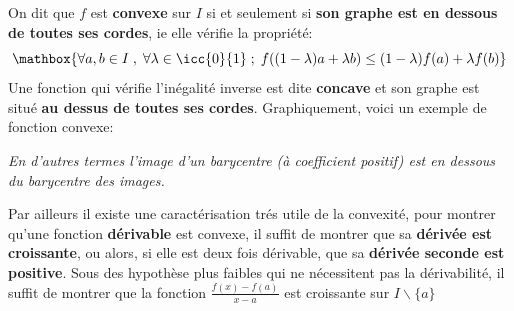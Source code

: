 \subsection*{}
On dit que \(f\) est \textbf{convexe} sur \(I\) si et seulement si \textbf{son graphe est en dessous de toutes ses cordes}, ie elle vérifie la propriété:
\[
   \mathbox{\forall a, b \in I \; , \; \forall \lambda \in \icc{0}{1}\; ; \; f((1-\lambda)a + \lambda b) \leq (1-\lambda)f(a) + \lambda f(b)}   
\]
Une fonction qui vérifie l'inégalité inverse est dite \textbf{concave} et son graphe est situé \textbf{au dessus de toutes ses cordes}.
Graphiquement, voici un exemple de fonction convexe:
\begin{center}
\end{center}
\begin{center}
   \textit{
      En d'autres termes l'image d'un barycentre (à coefficient positif) est en dessous du barycentre des images.
   }
\end{center}
Par ailleurs il existe une caractérisation trés utile de la convexité, pour montrer qu'une fonction \textbf{dérivable} est convexe, il suffit de montrer que sa \textbf{dérivée est croissante}, ou alors, si elle est deux fois dérivable, que sa \textbf{dérivée seconde est positive}.\+
Sous des hypothèse plus faibles qui ne nécessitent pas la dérivabilité, il suffit de montrer que la fonction \(\frac{f(x)-f(a)}{x-a}\) est croissante sur \(I \backslash \{a\}\)\<


